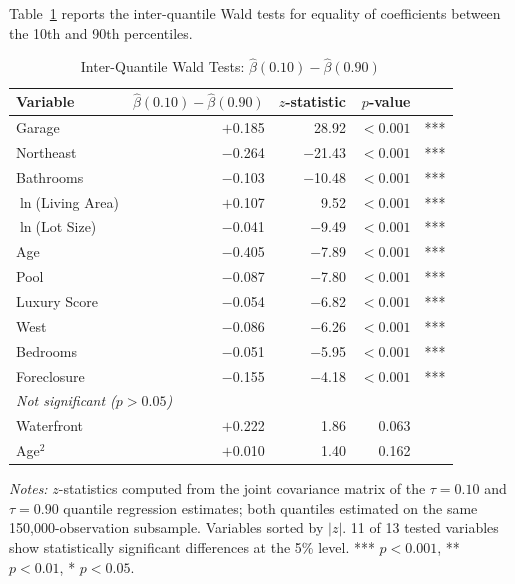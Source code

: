 Table~\ref{tab:iqr_tests} reports the inter-quantile Wald tests for equality of coefficients between the 10th and 90th percentiles.

\begin{table}[H]
\centering
\caption{Inter-Quantile Wald Tests: $\hat{\beta}(0.10) - \hat{\beta}(0.90)$}
\label{tab:iqr_tests}
\begin{threeparttable}
\small
\begin{tabular}{lrrrl}
\toprule
Variable & $\hat{\beta}(0.10) - \hat{\beta}(0.90)$ & $z$-statistic & $p$-value & \\
\midrule
Garage & $+$0.185 & 28.92 & $<0.001$ & *** \\
Northeast & $-$0.264 & $-$21.43 & $<0.001$ & *** \\
Bathrooms & $-$0.103 & $-$10.48 & $<0.001$ & *** \\
$\ln$(Living Area) & $+$0.107 & 9.52 & $<0.001$ & *** \\
$\ln$(Lot Size) & $-$0.041 & $-$9.49 & $<0.001$ & *** \\
Age & $-$0.405 & $-$7.89 & $<0.001$ & *** \\
Pool & $-$0.087 & $-$7.80 & $<0.001$ & *** \\
Luxury Score & $-$0.054 & $-$6.82 & $<0.001$ & *** \\
West & $-$0.086 & $-$6.26 & $<0.001$ & *** \\
Bedrooms & $-$0.051 & $-$5.95 & $<0.001$ & *** \\
Foreclosure & $-$0.155 & $-$4.18 & $<0.001$ & *** \\
\midrule
\multicolumn{5}{l}{\textit{Not significant ($p > 0.05$)}} \\
Waterfront & $+$0.222 & 1.86 & 0.063 & \\
Age$^2$ & $+$0.010 & 1.40 & 0.162 & \\
\bottomrule
\end{tabular}
\begin{tablenotes}
\small
\item \textit{Notes:} $z$-statistics computed from the joint covariance matrix of the $\tau = 0.10$ and $\tau = 0.90$ quantile regression estimates; both quantiles estimated on the same 150,000-observation subsample. Variables sorted by $|z|$. 11 of 13 tested variables show statistically significant differences at the 5\% level. *** $p<0.001$, ** $p<0.01$, * $p<0.05$.
\end{tablenotes}
\end{threeparttable}
\end{table}


